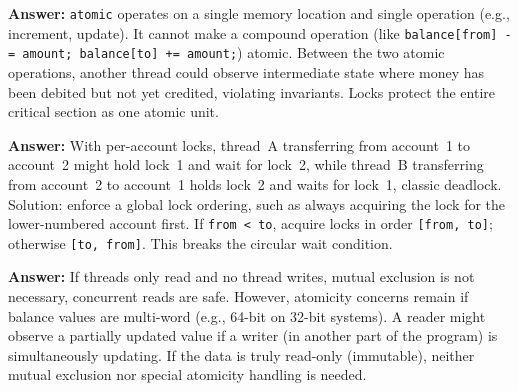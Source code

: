 \begin{ppexercises}
  
  \textbf{Answer:} \texttt{atomic} operates on a single memory location and single operation (e.g., increment, update). It cannot make a compound operation (like \texttt{balance[from] -= amount; balance[to] += amount;}) atomic. Between the two atomic operations, another thread could observe intermediate state where money has been debited but not yet credited, violating invariants. Locks protect the entire critical section as one atomic unit.
  
  
  \textbf{Answer:} With per-account locks, thread~A transferring from account~1 to account~2 might hold lock~1 and wait for lock~2, while thread~B transferring from account~2 to account~1 holds lock~2 and waits for lock~1, classic deadlock. Solution: enforce a global lock ordering, such as always acquiring the lock for the lower-numbered account first. If \texttt{from < to}, acquire locks in order \texttt{[from, to]}; otherwise \texttt{[to, from]}. This breaks the circular wait condition.
  
  
  \textbf{Answer:} If threads only read and no thread writes, mutual exclusion is not necessary, concurrent reads are safe. However, atomicity concerns remain if balance values are multi-word (e.g., 64-bit on 32-bit systems). A reader might observe a partially updated value if a writer (in another part of the program) is simultaneously updating. If the data is truly read-only (immutable), neither mutual exclusion nor special atomicity handling is needed.
  
  

\end{ppexercises}
